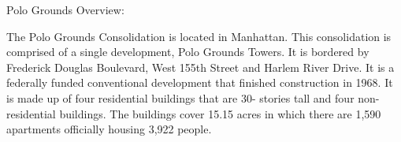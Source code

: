 Polo Grounds Overview:     

   

The Polo Grounds Consolidation is located in Manhattan. This consolidation is comprised of a single development, Polo Grounds Towers. It is bordered by Frederick Douglas Boulevard, West 155th Street and Harlem River Drive. It is a federally funded conventional development that finished construction in 1968. It is made up of four residential buildings that are 30- stories tall and four non-residential buildings. The buildings cover 15.15 acres in which there are 1,590 apartments officially housing 3,922 people. 